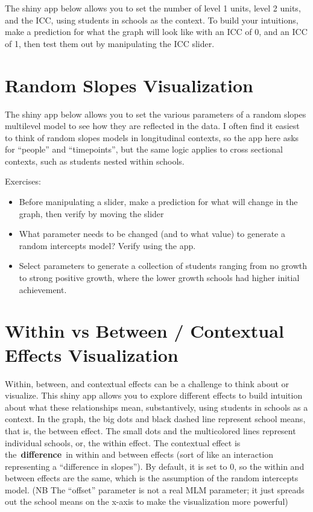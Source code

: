 \documentclass[
  letterpaper,
  DIV=11,
  numbers=noendperiod]{scrreprt}
\begin{document}
The shiny app below allows you to set the number of level 1 units, level
2 units, and the ICC, using students in schools as the context. To build
your intuitions, make a prediction for what the graph will look like
with an ICC of 0, and an ICC of 1, then test them out by manipulating
the ICC slider.

\chapter{Random Slopes Visualization}\label{random-slopes-visualization}

The shiny app below allows you to set the various parameters of a random
slopes multilevel model to see how they are reflected in the data. I
often find it easiest to think of random slopes models in longitudinal
contexts, so the app here asks for ``people'' and ``timepoints'', but
the same logic applies to cross sectional contexts, such as students
nested within schools.

Exercises:

\begin{itemize}
\item
  Before manipulating a slider, make a prediction for what will change
  in the graph, then verify by moving the slider
\item
  What parameter needs to be changed (and to what value) to generate a
  random intercepts model? Verify using the app.
\item
  Select parameters to generate a collection of students ranging from no
  growth to strong positive growth, where the lower growth schools had
  higher initial achievement.
\end{itemize}

\chapter{Within vs Between / Contextual Effects
Visualization}\label{within-vs-between-contextual-effects-visualization}

Within, between, and contextual effects can be a challenge to think
about or visualize. This shiny app allows you to explore different
effects to build intuition about what these relationships mean,
substantively, using students in schools as a context. In the graph, the
big dots and black dashed line represent school means, that is, the
between effect. The small dots and the multicolored lines represent
individual schools, or, the within effect. The contextual effect is
the~\textbf{difference}~in within and between effects (sort of like an
interaction representing a ``difference in slopes''). By default, it is
set to 0, so the within and between effects are the same, which is the
assumption of the random intercepts model. (NB The ``offset'' parameter
is not a real MLM parameter; it just spreads out the school means on the
x-axis to make the visualization more powerful)
\end{document}
